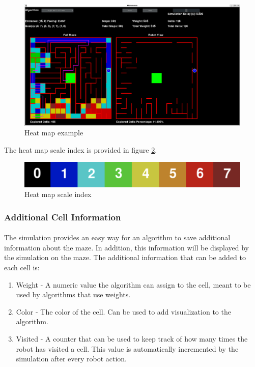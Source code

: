 \documentclass[12pt]{article}
\begin{document}
\begin{figure}[H]
\centering
\includegraphics[width=\textwidth]{images/simulation_heatmap.png}
\caption{Heat map example}
\label{Heat map example}
\end{figure}

The heat map scale index is provided in figure \ref{Heat map scale}.

\begin{figure}[H]
\centering
\includegraphics[width=\textwidth]{images/heatmap.png}
\caption{Heat map scale index}
\label{Heat map scale}
\end{figure}

\subsubsection{Additional Cell Information}
\paragraph{}
The simulation provides an easy way for an algorithm to save additional information about the \gls{maze}.
In addition, this information will be displayed by the simulation on the \gls{maze}.
The additional information that can be added to each \gls{cell} is:
\begin{enumerate}
    \item Weight - A numeric value the algorithm can assign to the \gls{cell}, meant to be used by algorithms that use weights.
    \item Color - The color of the \gls{cell}.
    Can be used to add visualization to the algorithm. 
    \item Visited - A counter that can be used to keep track of how many times the robot has visited a \gls{cell}. This value is automatically incremented by the simulation after every robot action.
\end{enumerate}
\end{document}
